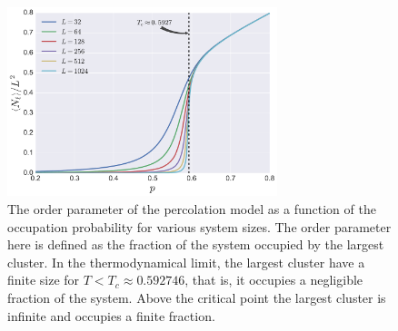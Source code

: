 \begin{figure}
\begin{center}
    \includegraphics[width=0.7\textwidth]{chapters/ch2-crit/figs/isoperco2}
\end{center}
\caption{The order parameter of the percolation model as a function of the
    occupation probability for various system sizes. The order parameter here
    is defined as the fraction of the system occupied by the largest cluster.
    In the thermodynamical limit, the largest cluster have a finite size for
    $T<T_c\approx 0.592746$, that is, it occupies a negligible fraction of the
    system. Above the critical point the largest cluster is infinite and occupies
    a finite fraction.}
\label{fig:isoperco2}
\end{figure}



